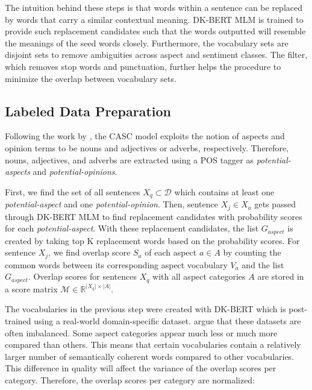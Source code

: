 \documentclass[american, oneside]{ecsgdp}
\begin{document}
The intuition behind these steps is that words within a sentence can be replaced by words that carry a similar contextual meaning. DK-BERT MLM is trained to provide such replacement candidates such that the words outputted will resemble the meanings of the seed words closely. Furthermore, the vocabulary sets are disjoint sets to remove ambiguities across aspect and sentiment classes. The filter, which removes stop words and punctuation, further helps the procedure to minimize the overlap between vocabulary sets.

\begin{figure}[htbp]
  \centering
  
  \caption{}
  \label{fig:casc1}
\end{figure}

\subsection{Labeled Data Preparation} \label{sec:labeler}
Following the work by \textcite{Hu2004Rules}, the CASC model exploits the notion of aspects and opinion terms to be nouns and adjectives or adverbs, respectively. Therefore, nouns, adjectives, and adverbs are extracted using a POS tagger as \textit{potential-aspects} and \textit{potential-opinions}. %

First, we find the set of all sentences $X_q \subset \mathcal{D}$ which contains at least one \textit{potential-aspect} and one \textit{potential-opinion}. Then, sentence $X_j \in X_a$ gets passed through DK-BERT MLM to find replacement candidates with probability scores for each \textit{potential-aspect}. With these replacement candidates, the list $G_{aspect}$ is created by taking top K replacement words based on the probability scores. For sentence $X_j$, we find overlap score $S_a$ of each aspect $a \in A$ by counting the common words between its corresponding aspect vocabulary $V_a$ and the list $G_{aspect}$. Overlap scores for sentences $X_q$ with all aspect categories $A$ are stored in a score matrix $\mathcal{M} \in \mathbb{R}^{\lvert X_q \rvert \times \lvert A \rvert}$.


The vocabularies in the previous step were created with DK-BERT which is post-trained using a real-world domain-specific dataset. \textcite{Kumar2021CASC} argue that these datasets are often imbalanced. Some aspect categories appear much less or much more compared than others. This means that certain vocabularies contain a relatively larger number of semantically coherent words compared to other vocabularies. This difference in quality will affect the variance of the overlap scores per category. Therefore, the overlap scores per category are normalized:
\end{document}
